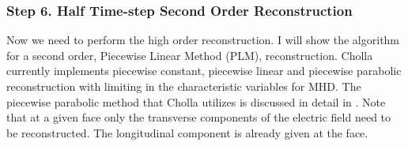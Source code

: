 \subsubsection{Step 6. Half Time-step Second Order Reconstruction}
\label{vlct:higher-order-reconstruction}

Now we need to perform the high order reconstruction. I will show the algorithm for a second order, Piecewise Linear Method (PLM), reconstruction. Cholla currently implements piecewise constant, piecewise linear and piecewise parabolic reconstruction with limiting in the characteristic variables for MHD. The piecewise parabolic method that Cholla utilizes is discussed in detail in \cite{felker_2020}. Note that at a given face only the transverse components of the electric field need to be reconstructed. The longitudinal component is already given at the face.

